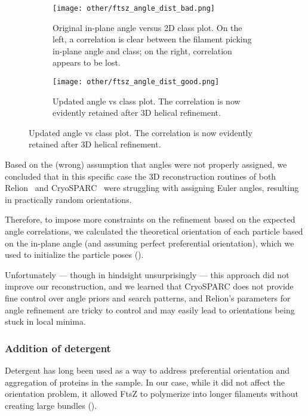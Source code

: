 \begin{figure}
    \centering
    \begin{subfigure}[B]{\textwidth}
        \centering
        \texttt{[image: other/ftsz\_angle\_dist\_bad.png]}
        \caption{Original in-plane angle versus 2D class plot. On the left, a correlation is clear between the filament picking in-plane angle and class; on the right, correlation appears to be lost.}
        \label{fig:ftsz_filament_angles_bad}
    \end{subfigure}
    \begin{subfigure}[B]{\textwidth}
        \centering
        \texttt{[image: other/ftsz\_angle\_dist\_good.png]}
        \caption{Updated angle vs class plot. The correlation is now evidently retained after 3D helical refinement.}
        \label{fig:ftsz_filament_angles_good}
    \end{subfigure}%
    \label{fig:ftsz_filament_angles}
\end{figure}

Based on the (wrong) assumption that angles were not properly assigned, we concluded that in this specific case the 3D reconstruction routines of both Relion~\cite{scheresRELIONImplementationBayesian2012} and CryoSPARC~\cite{punjaniCryoSPARCAlgorithmsRapid2017} were struggling with assigning Euler angles, resulting in practically random orientations.

Therefore, to impose more constraints on the refinement based on the expected angle correlations, we calculated the theoretical orientation of each particle based on the in-plane angle (and assuming perfect preferential orientation), which we used to initialize the particle poses ().

Unfortunately --- though in hindsight unsurprisingly --- this approach did not improve our reconstruction, and we learned that CryoSPARC does not provide fine control over angle priors and search patterns, and Relion's parameters for angle refinement are tricky to control and may easily lead to orientations being stuck in local minima.

\FloatBarrier

\subsubsection{Addition of detergent}
Detergent has long been used as a way to address preferential orientation and aggregation of proteins in the sample.
In our case, while it did not affect the orientation problem, it allowed FtsZ to polymerize into longer filaments without creating large bundles ().

